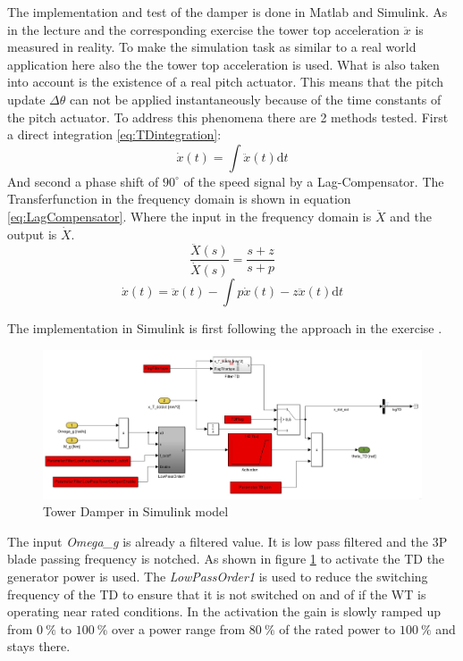 The implementation and test of the damper is done in Matlab and Simulink. As in the lecture and the corresponding exercise \cite{2024} the tower top acceleration $\ddot{x}$ is measured in reality. To make the simulation task as similar to a real world application here also the the tower top acceleration is used. What is also taken into account is the existence of a real pitch actuator. This means that the pitch update $\Delta\theta$ can not be applied instantaneously because of the time constants of the pitch actuator. To address this phenomena there are 2 methods tested. First a direct integration \ref{eq:TDintegration}: 
\begin{equation}
	\dot{x}(t) = \int\ddot{x}(t) \text{d}t
	\label{eq:TDintegration}
\end{equation} 
And second a phase shift of $90^{\circ}$ of the speed signal by a Lag-Compensator. The Transferfunction in the frequency domain is shown in equation \ref{eq:LagCompensator}. Where the input in the frequency domain is $\ddot{X}$ and the output is $\dot{X}$. 
\begin{equation}
	\frac{\ddot{X}(s)}{\dot{X}(s)} = \frac{s + z}{s + p}
	\label{eq:LagCompensator}
\end{equation} 
\begin{equation}
	\dot{x}(t) = \ddot{x}(t) - \int p\dot{x}(t) - z\ddot{x}(t) \text{d}t
	\label{eq:xddTimeDomain}
\end{equation} 


The implementation in Simulink is first following the approach in the exercise \cite{2024}.
\begin{figure}[tbh]
	\centering	
	\includegraphics[width=12cm]{Figures/TDoverview}
	\caption{Tower Damper in Simulink model}
	\label{fig:TDoverview}
\end{figure}  
The input \textit{Omega\_g} is already a filtered value. It is low pass filtered and the 3P blade passing frequency is notched. As shown in figure \ref{fig:TDoverview} to activate the TD the generator power is used. The \textit{LowPassOrder1} is used to reduce the switching frequency of the TD to ensure that it is not switched on and of if the WT is operating near rated conditions. In the activation the gain is slowly ramped up from $\SI{0}{\%}$ to $\SI{100}{\%}$ over a power range from $\SI{80}{\%}$ of the rated power to $\SI{100}{\%}$ and stays there. 

